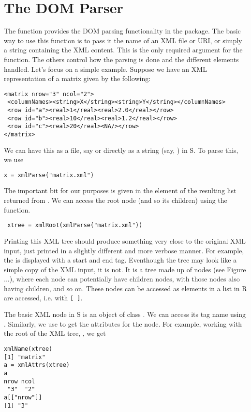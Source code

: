 \section{The DOM Parser}
The  function provides the DOM parsing
functionality in the  package.  The basic way to use
this function is to pass it the name of an XML file or URI, or simply a string
containing the XML content.  This is the only required argument for
the function. The others control how the parsing is done and the
different elements handled. 
Let's focus on a simple example. Suppose we have an XML representation of 
a matrix given by the following:
\begin{verbatim}
<matrix nrow="3" ncol="2">
 <columnNames><string>X</string><string>Y</string></columnNames>
 <row id="a"><real>1</real><real>2.0</real></row>
 <row id="b"><real>10</real><real>1.2</real></row>
 <row id="c"><real>20</real><NA/></row>
</matrix>
\end{verbatim}\label{eg:XML:matrix}
We can have this as a file, say 
or directly as a string (say, ) in S.
To parse this, we use 
\begin{verbatim}
x = xmlParse("matrix.xml")
\end{verbatim}
The important bit for our purposes is given in the 
element of the resulting list returned from .  We
can access the root node (and so its children) using the
 function.
\begin{verbatim}
 xtree = xmlRoot(xmlParse("matrix.xml"))
\end{verbatim}

Printing this XML tree should produce something very close to the
original XML input, just printed in a slightly different and more
verbose manner. For example, the  is displayed with a start
and end tag.  Eventhough the tree may look like a simple copy of the
XML input, it is not.  It is a tree made up of nodes (see Figure ...),
where each node can potentially have children nodes, with those nodes
also having children, and so on.  These nodes can be accessed as
elements in a list in R are accessed, i.e. with \verb+[ ]+.

The basic XML node in S is an object of class .  We
can access its tag name using .  Similarly, we use
 to get the attributes for the node.
For example, working with the root of the XML tree, ,
we get
\begin{verbatim}
xmlName(xtree)
[1] "matrix"
a = xmlAttrs(xtree)
a
nrow ncol 
 "3"  "2" 
a[["nrow"]]
[1] "3"
\end{verbatim}

